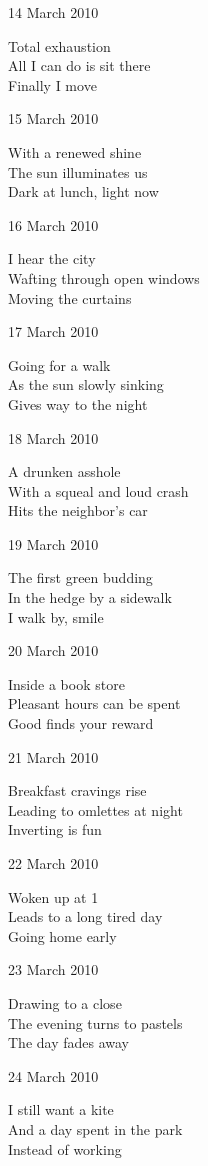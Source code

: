\documentclass[12pt]{article}
\begin{document}
14 March 2010

Total exhaustion \\
All I can do is sit there \\
Finally I move

15 March 2010

With a renewed shine \\
The sun illuminates us \\
Dark at lunch, light now

16 March 2010

I hear the city \\
Wafting through open windows \\
Moving the curtains

17 March 2010

Going for a walk \\
As the sun slowly sinking \\
Gives way to the night

\newpage

18 March 2010

A drunken asshole \\
With a squeal and loud crash \\
Hits the neighbor's car

19 March 2010

The first green budding \\
In the hedge by a sidewalk \\
I walk by, smile

20 March 2010

Inside a book store \\
Pleasant hours can be spent \\
Good finds your reward

21 March 2010

Breakfast cravings rise \\
Leading to omlettes at night \\
Inverting is fun

22 March 2010

Woken up at 1 \\
Leads to a long tired day \\
Going home early

23 March 2010

Drawing to a close \\
The evening turns to pastels \\
The day fades away

24 March 2010

I still want a kite \\
And a day spent in the park \\
Instead of working
\end{document}
